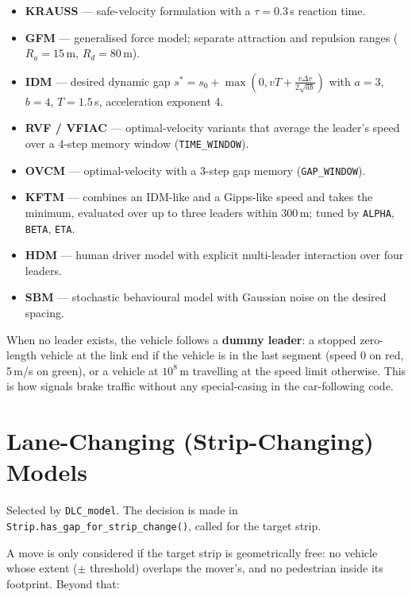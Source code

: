 \documentclass[11pt, a4paper]{article}
\newcommand{\code}[1]{\texttt{#1}}
\begin{document}
\begin{itemize}
    \item \textbf{KRAUSS} --- safe-velocity formulation with a $\tau = 0.3$\,s
          reaction time.
    \item \textbf{GFM} --- generalised force model; separate attraction and
          repulsion ranges ($R_a = 15$\,m, $R_d = 80$\,m).
    \item \textbf{IDM} --- desired dynamic gap
          $s^{*} = s_0 + \max\!\left(0, vT + \frac{v\Delta v}{2\sqrt{ab}}\right)$
          with $a=3$, $b=4$, $T=1.5$\,s, acceleration exponent 4.
    \item \textbf{RVF / VFIAC} --- optimal-velocity variants that average the
          leader's speed over a 4-step memory window (\code{TIME\_WINDOW}).
    \item \textbf{OVCM} --- optimal-velocity with a 3-step gap memory
          (\code{GAP\_WINDOW}).
    \item \textbf{KFTM} --- combines an IDM-like and a Gipps-like speed and takes
          the minimum, evaluated over up to three leaders within 300\,m; tuned by
          \code{ALPHA}, \code{BETA}, \code{ETA}.
    \item \textbf{HDM} --- human driver model with explicit multi-leader
          interaction over four leaders.
    \item \textbf{SBM} --- stochastic behavioural model with Gaussian noise on
          the desired spacing.
\end{itemize}

When no leader exists, the vehicle follows a \textbf{dummy leader}: a stopped
zero-length vehicle at the link end if the vehicle is in the last segment
(speed 0 on red, 5\,m/s on green), or a vehicle at $10^8$\,m travelling at the
speed limit otherwise. This is how signals brake traffic without any
special-casing in the car-following code.

\section{Lane-Changing (Strip-Changing) Models}
\label{sec:dlc}

Selected by \code{DLC\_model}. The decision is made in
\code{Strip.has\_gap\_for\_strip\_change()}, called for the target strip.

A move is only considered if the target strip is geometrically free: no vehicle
whose extent ($\pm$ threshold) overlaps the mover's, and no pedestrian inside its
footprint. Beyond that:
\end{document}
